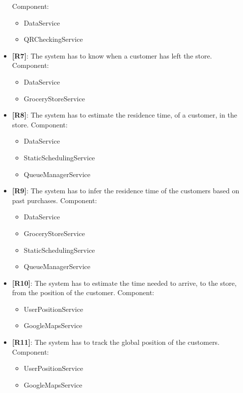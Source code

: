 \begin{itemize}
    Component:
    \begin{itemize}
        \item DataService
        \item QRCheckingService
    \end{itemize}
    \item {\textbf{[R7]}}: The system has to know when a customer has left the store.
    Component:
    \begin{itemize}
        \item DataService
        \item GroceryStoreService
    \end{itemize}
    \item {\textbf{[R8]}}: The system has to estimate the residence time, of a customer, in the store.
    Component:
    \begin{itemize}
        \item DataService
        \item StaticSchedulingService
        \item QueueManagerService
    \end{itemize}
    \item {\textbf{[R9]}}: The system has to infer the residence time of the customers based on past purchases.
    Component:
    \begin{itemize}
        \item DataService
        \item GroceryStoreService
        \item StaticSchedulingService
        \item QueueManagerService
    \end{itemize}
    \item {\textbf{[R10]}}: The system has to estimate the time needed to arrive, to the store, from the position of the customer.
    Component:
    \begin{itemize}
        \item UserPositionService
        \item GoogleMapsService
    \end{itemize}
    \item {\textbf{[R11]}}: The system has to track the global position of the customers.
    Component:
    \begin{itemize}
        \item UserPositionService
        \item GoogleMapsService
    \end{itemize}

\end{itemize}
